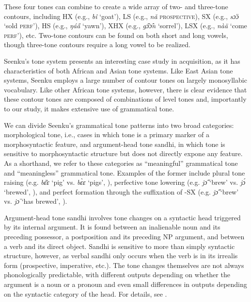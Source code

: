 \documentclass[output=paper,colorlinks,citecolor=brown,
]{langscibook}
\begin{document}
These four tones can combine to create a wide array of two- and three-tone contours, including HX (e.g., \textit{bî} `goat'), LS (e.g., \textit{nǎ} \textsc{prospective}), SX (e.g., \textit{sɔ̈ɔ} `sold \textsc{perf}'), HS (e.g., \textit{ŋáa̋}  `yawn'), XHX (e.g., \textit{gɔ̏ɔ̂n} `sorrel'), LSX (e.g., \textit{nàä} `come \textsc{perf}'), etc. Two-tone contours can be found on both short and long vowels, though three-tone contours require a long vowel to be realized.



Seenku's tone system presents an interesting case study in acquisition, as it has characteristics of both African and Asian tone systems. Like East Asian tone systems, Seenku employs a large number of contour tones on largely monosyllabic vocabulary. Like other African tone systems, however, there is clear evidence that these contour tones are composed of combinations of level tones and, importantly to our study, it makes extensive use of grammatical tone. 

We can divide Seenku's grammatical tone patterns into two broad categories: morphological tone, i.e., cases in which tone is a primary marker of a morphosyntactic feature, and argument-head tone sandhi, in which tone is sensitive to morphosyntactic structure but does not directly expone any feature. As a shorthand, we refer to these categories as ``meaningful'' grammatical tone and ``meaningless'' grammatical tone. Examples of the former include plural tone raising (e.g. \textit{bɛ̏ɛ} `pig' vs. \textit{bɛ̀ɛ} `pigs', \citealt{McPherson17a}), perfective tone lowering (e.g. \textit{jɔ̋} `brew' vs. \textit{jɔ́} `brewed', \citealt{McPherson17b}), and perfect formation through the suffixation of -SX (e.g. \textit{jɔ̋} `brew' vs. \textit{jɔ̈} `has brewed', \citealt{McPherson20}). 

Argument-head tone sandhi involves tone changes on a syntactic head triggered by its internal argument. It is found between an inalienable noun and its preceding possessor, a postposition and its preceding NP argument, and between a verb and its direct object. Sandhi is sensitive to more than simply syntactic structure, however, as verbal sandhi only occurs when the verb is in its irrealis form (prospective, imperative, etc.). The tone changes themselves are not always phonologically predictable, with different outputs depending on whether the argument is a noun or a pronoun and even small differences in outputs depending on the syntactic category of the head. For details, see \citet{McPherson19}. 
\end{document}
